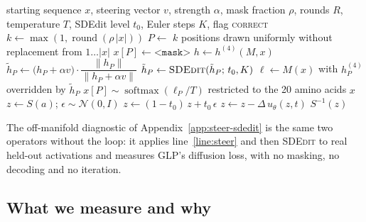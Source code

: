 \documentclass{article}
\begin{document}
\begin{algorithm}[htbp]
\caption{On-manifold steering by masked-Gibbs decoding. $M$: ESM-2-8M; $h^{(4)}$: its
layer-4 residual stream (the tensor GLP is trained on); $u_\theta$: the GLP velocity field;
$S$: the standardizer fitted on the activation store. Canonical Exp.~B settings:
$\rho{=}0.10$, $R{=}30$, $T{=}1.0$, $t_0{=}0.7$, $K{=}20$. The ``down'' arm is the same
call with $-\alpha$, started from held-out proteins at the opposite extreme of the
property.}
\label{alg:steer}
\begin{algorithmic}[1]
\Require starting sequence $x$, steering vector $v$, strength $\alpha$, mask fraction $\rho$,
rounds $R$, temperature $T$, SDEdit level $t_0$, Euler steps $K$, flag \textsc{correct}
\State $k \gets \max(1, \operatorname{round}(\rho\,|x|))$
  \State $P \gets$ $k$ positions drawn uniformly without replacement from $1\dots|x|$
  \State $x[P] \gets \texttt{<mask>}$
  \State $h \gets h^{(4)}(M, x)$ 
  \State $\tilde h_P \gets \big(h_P + \alpha v\big)\cdot \dfrac{\lVert h_P \rVert}{\lVert h_P + \alpha v \rVert}$ \label{line:steer} 
    \State $\tilde h_P \gets \textsc{SDEdit}(\tilde h_P;\, t_0, K)$ \label{line:correct} 
  \EndIf
  \State $\ell \gets M(x)$ with $h^{(4)}_P$ overridden by $\tilde h_P$ 
  \State $x[P] \sim \operatorname{softmax}(\ell_P / T)$ restricted to the 20 amino acids
\EndFor
\State \Return $x$
\Statex
{}
  \State $z \gets S(a)$; \quad $\epsilon \sim \mathcal{N}(0, I)$
  \State $z \gets (1-t_0)\,z + t_0\,\epsilon$ 
    \State $z \gets z - \Delta\, u_\theta(z, t)$
  \EndFor
  \State \Return $S^{-1}(z)$
\EndFunction
\end{algorithmic}
\end{algorithm}

The off-manifold diagnostic of Appendix~\ref{app:steer-sdedit} is the same two operators
without the loop: it applies line~\ref{line:steer} and then \textsc{SDEdit} to real held-out
activations and measures GLP's diffusion loss, with no masking, no decoding and no
iteration.

\subsection{What we measure and why}
\label{app:steer-estimand}
\end{document}
